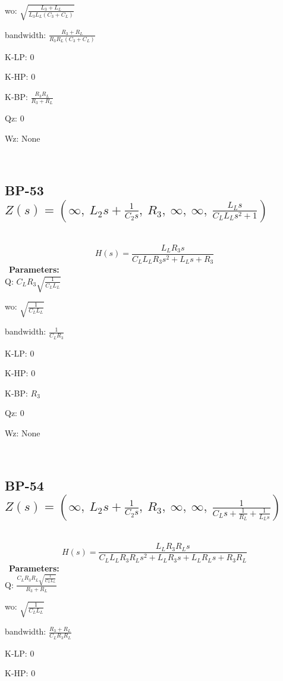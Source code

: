 \documentclass{article}
\begin{document}
wo: $\sqrt{\frac{L_{3} + L_{L}}{L_{3} L_{L} \left(C_{3} + C_{L}\right)}}$\ 

bandwidth: $\frac{R_{3} + R_{L}}{R_{3} R_{L} \left(C_{3} + C_{L}\right)}$\ 

K-LP: $0$\ 

K-HP: $0$\ 

K-BP: $\frac{R_{3} R_{L}}{R_{3} + R_{L}}$\ 

Qz: $0$\ 

Wz: $\text{None}$\ 

\ 

\subsection{BP-53 $Z(s) = \left( \infty, \  L_{2} s + \frac{1}{C_{2} s}, \  R_{3}, \  \infty, \  \infty, \  \frac{L_{L} s}{C_{L} L_{L} s^{2} + 1}\right)$ } \ 
\textbf{\[H(s) = \frac{L_{L} R_{3} s}{C_{L} L_{L} R_{3} s^{2} + L_{L} s + R_{3}}\] } \ 
\textbf{Parameters:}\\ 

Q: $C_{L} R_{3} \sqrt{\frac{1}{C_{L} L_{L}}}$\ 

wo: $\sqrt{\frac{1}{C_{L} L_{L}}}$\ 

bandwidth: $\frac{1}{C_{L} R_{3}}$\ 

K-LP: $0$\ 

K-HP: $0$\ 

K-BP: $R_{3}$\ 

Qz: $0$\ 

Wz: $\text{None}$\ 

\ 

\subsection{BP-54 $Z(s) = \left( \infty, \  L_{2} s + \frac{1}{C_{2} s}, \  R_{3}, \  \infty, \  \infty, \  \frac{1}{C_{L} s + \frac{1}{R_{L}} + \frac{1}{L_{L} s}}\right)$ } \ 
\textbf{\[H(s) = \frac{L_{L} R_{3} R_{L} s}{C_{L} L_{L} R_{3} R_{L} s^{2} + L_{L} R_{3} s + L_{L} R_{L} s + R_{3} R_{L}}\] } \ 
\textbf{Parameters:}\\ 

Q: $\frac{C_{L} R_{3} R_{L} \sqrt{\frac{1}{C_{L} L_{L}}}}{R_{3} + R_{L}}$\ 

wo: $\sqrt{\frac{1}{C_{L} L_{L}}}$\ 

bandwidth: $\frac{R_{3} + R_{L}}{C_{L} R_{3} R_{L}}$\ 

K-LP: $0$\ 

K-HP: $0$\ 
\end{document}

